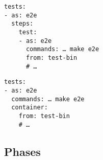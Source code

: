 \begin{frame}[fragile]
    \autotitle
    \small
    \begin{multicols}{2}
        \begin{verbatim}
tests:
- as: e2e
  steps:
    test:
    - as: e2e
      commands: … make e2e
      from: test-bin
      # …
        \end{verbatim}
        \columnbreak
        \begin{verbatim}
tests:
- as: e2e
  commands: … make e2e
  container:
    from: test-bin
    # …
        \end{verbatim}
    \end{multicols}
\end{frame}

\subsection{Phases}

